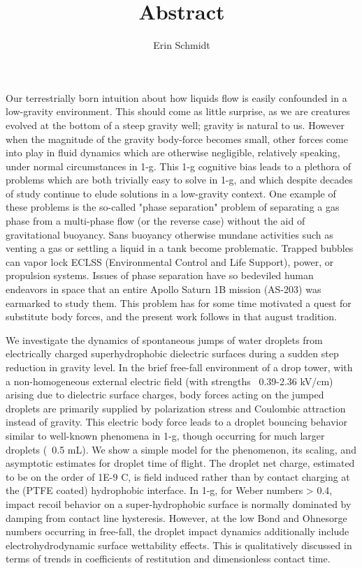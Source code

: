 \documentclass[10pt,a4paper]{article}
\author{Erin Schmidt}
\title{Abstract}
\begin{document}
Our terrestrially born intuition about how liquids flow is easily confounded in a low-gravity environment. This should come as little surprise, as we are creatures evolved at the bottom of a steep gravity well; gravity is natural to us. However when the magnitude of the gravity body-force becomes small, other forces come into play in fluid dynamics which are otherwise negligible, relatively speaking, under normal circumstances in 1-g. This 1-g cognitive bias leads to a plethora of problems which are both trivially easy to solve in 1-g, and which despite decades of study continue to elude solutions in a low-gravity context. One example of these problems is the so-called "phase separation" problem of separating a gas phase from a multi-phase flow (or the reverse case) without the aid of gravitational buoyancy. Sans buoyancy otherwise mundane activities such as venting a gas or settling a liquid in a tank become problematic. Trapped bubbles can vapor lock ECLSS (Environmental Control and Life Support), power, or propulsion systems. Issues of phase separation have so bedeviled human endeavors in space that an entire Apollo Saturn 1B mission (AS-203) was earmarked to study them. This problem has for some time motivated a quest for substitute body forces, and the present work follows in that august tradition.

We investigate the dynamics of spontaneous jumps of water droplets from electrically charged superhydrophobic dielectric surfaces during a sudden step reduction in gravity level. In the brief free-fall environment of a drop tower, with a non-homogeneous external electric field (with strengths ~0.39-2.36 kV/cm) arising due to dielectric surface charges, body forces acting on the jumped droplets are primarily supplied by polarization stress and Coulombic attraction instead of gravity. This electric body force leads to a droplet bouncing behavior similar to well-known phenomena in 1-g, though occurring for much larger droplets (~0.5 mL). We show a simple model for the phenomenon, its scaling, and asymptotic estimates for droplet time of flight. The droplet net charge, estimated to be on the order of 1E-9 C, is field induced rather than by contact charging at the (PTFE coated) hydrophobic interface. In 1-g, for Weber numbers > 0.4, impact recoil behavior on a super-hydrophobic surface is normally dominated by damping from contact line hysteresis. However, at the low Bond and Ohnesorge numbers occurring in free-fall, the droplet impact dynamics additionally include electrohydrodynamic surface wettability effects. This is qualitatively discussed in terms of trends in coefficients of restitution and dimensionless contact time. 
\end{document}
